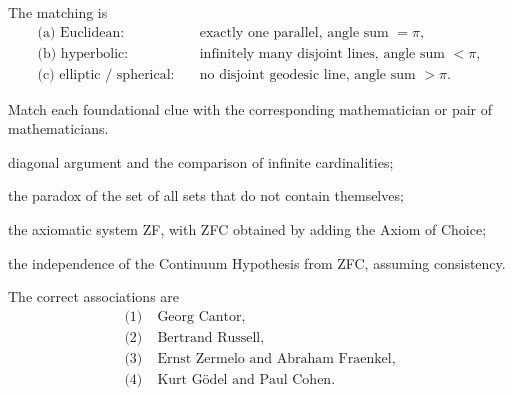    \begin{solution}
        The matching is
        \[
            \boxed{
                \begin{aligned}
                    \text{(a) Euclidean:}&\quad
                    \text{exactly one parallel, angle sum }=\pi,\\
                    \text{(b) hyperbolic:}&\quad
                    \text{infinitely many disjoint lines, angle sum }<\pi,\\
                    \text{(c) elliptic / spherical:}&\quad
                    \text{no disjoint geodesic line, angle sum }>\pi.
                \end{aligned}
            }
        \]
    \end{solution}

    \begin{expectedproblem}
        Match each foundational clue with the corresponding mathematician or
        pair of mathematicians.
        \begin{problemchoices}
            \item diagonal argument and the comparison of infinite
                  cardinalities;
            \item the paradox of the set of all sets that do not contain
                  themselves;
            \item the axiomatic system ZF, with ZFC obtained by adding the
                  Axiom of Choice;
            \item the independence of the Continuum Hypothesis from ZFC,
                  assuming consistency.
        \end{problemchoices}
    \end{expectedproblem}

    \begin{solution}
        The correct associations are
        \[
            \boxed{
                \begin{aligned}
                    \text{(1)}\;&\text{Georg Cantor},\\
                    \text{(2)}\;&\text{Bertrand Russell},\\
                    \text{(3)}\;&\text{Ernst Zermelo and Abraham Fraenkel},\\
                    \text{(4)}\;&\text{Kurt G\"odel and Paul Cohen}.
                \end{aligned}
            }
        \]
    \end{solution}

